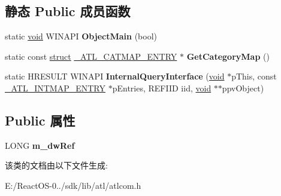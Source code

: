 \subsection*{静态 Public 成员函数}
\begin{DoxyCompactItemize}
\item 
\mbox{\label{class_a_t_l_1_1_c_com_object_root_base_a9c7e77f8715e77916d4898557c38c014}} 
static \hyperlink{interfacevoid}{void} W\+I\+N\+A\+PI {\bfseries Object\+Main} (bool)
\item 
\mbox{\label{class_a_t_l_1_1_c_com_object_root_base_a33d3a8af4d989356668fd99ef6f9d750}} 
static const \hyperlink{interfacestruct}{struct} \hyperlink{struct_a_t_l_1_1___a_t_l___c_a_t_m_a_p___e_n_t_r_y}{\+\_\+\+A\+T\+L\+\_\+\+C\+A\+T\+M\+A\+P\+\_\+\+E\+N\+T\+RY} $\ast$ {\bfseries Get\+Category\+Map} ()
\item 
\mbox{\label{class_a_t_l_1_1_c_com_object_root_base_a63d22125da2c0c389d6b1ecdc2bb3534}} 
static H\+R\+E\+S\+U\+LT W\+I\+N\+A\+PI {\bfseries Internal\+Query\+Interface} (\hyperlink{interfacevoid}{void} $\ast$p\+This, const \hyperlink{struct_a_t_l_1_1___a_t_l___i_n_t_m_a_p___e_n_t_r_y}{\+\_\+\+A\+T\+L\+\_\+\+I\+N\+T\+M\+A\+P\+\_\+\+E\+N\+T\+RY} $\ast$p\+Entries, R\+E\+F\+I\+ID iid, \hyperlink{interfacevoid}{void} $\ast$$\ast$ppv\+Object)
\end{DoxyCompactItemize}
\subsection*{Public 属性}
\begin{DoxyCompactItemize}
\item 
\mbox{\label{class_a_t_l_1_1_c_com_object_root_base_a9e7652a0dd6cf9b08c7f67231609affb}} 
L\+O\+NG {\bfseries m\+\_\+dw\+Ref}
\end{DoxyCompactItemize}


该类的文档由以下文件生成\+:\begin{DoxyCompactItemize}
\item 
E\+:/\+React\+O\+S-\/0../sdk/lib/atl/atlcom.\+h\end{DoxyCompactItemize}
